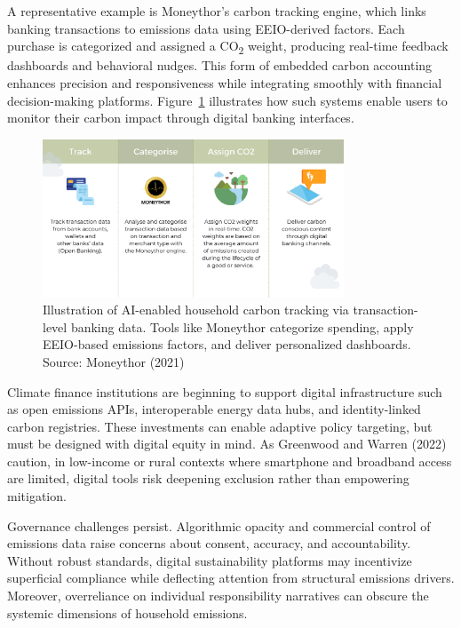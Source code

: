 \documentclass[12pt,a4paper]{article}%
\begin{document}
A representative example is Moneythor’s carbon tracking engine, which links banking transactions to emissions data using EEIO-derived factors. Each purchase is categorized and assigned a CO\textsubscript{2} weight, producing real-time feedback dashboards and behavioral nudges. This form of embedded carbon accounting enhances precision and responsiveness while integrating smoothly with financial decision-making platforms. Figure~\ref{fig:carbontracker} illustrates how such systems enable users to monitor their carbon impact through digital banking interfaces.

\begin{figure}[htbp]
\centering
\includegraphics[width=0.8\textwidth]{moneythor.png} %
\caption{\small{Illustration of AI-enabled household carbon tracking via transaction-level banking data. Tools like Moneythor categorize spending, apply EEIO-based emissions factors, and deliver personalized dashboards. Source: Moneythor (2021)}}
\label{fig:carbontracker}
\end{figure}

Climate finance institutions are beginning to support digital infrastructure such as open emissions APIs, interoperable energy data hubs, and identity-linked carbon registries. These investments can enable adaptive policy targeting, but must be designed with digital equity in mind. As Greenwood and Warren (2022) caution, in low-income or rural contexts where smartphone and broadband access are limited, digital tools risk deepening exclusion rather than empowering mitigation.

Governance challenges persist. Algorithmic opacity and commercial control of emissions data raise concerns about consent, accuracy, and accountability. Without robust standards, digital sustainability platforms may incentivize superficial compliance while deflecting attention from structural emissions drivers. Moreover, overreliance on individual responsibility narratives can obscure the systemic dimensions of household emissions.
\end{document}
